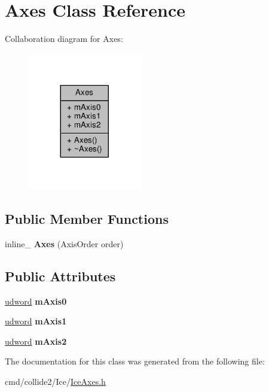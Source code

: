 \hypertarget{classAxes}{}\section{Axes Class Reference}
\label{classAxes}


Collaboration diagram for Axes\+:
\nopagebreak
\begin{figure}[H]
\begin{center}
\leavevmode
\includegraphics[width=140pt]{d1/d79/classAxes__coll__graph}
\end{center}
\end{figure}
\subsection*{Public Member Functions}
\begin{DoxyCompactItemize}
\item 
inline\+\_\+ {\bfseries Axes} (Axis\+Order order)\hypertarget{classAxes_afc6cb9cc184d368fc3396822721b7396}{}\label{classAxes_afc6cb9cc184d368fc3396822721b7396}

\end{DoxyCompactItemize}
\subsection*{Public Attributes}
\begin{DoxyCompactItemize}
\item 
\hyperlink{IceTypes_8h_a44c6f1920ba5551225fb534f9d1a1733}{udword} {\bfseries m\+Axis0}\hypertarget{classAxes_ac5bcbfce6741b8846eb8d21aef50081c}{}\label{classAxes_ac5bcbfce6741b8846eb8d21aef50081c}

\item 
\hyperlink{IceTypes_8h_a44c6f1920ba5551225fb534f9d1a1733}{udword} {\bfseries m\+Axis1}\hypertarget{classAxes_a7ca52fbdbdfeb2e2f0374ebe5e546444}{}\label{classAxes_a7ca52fbdbdfeb2e2f0374ebe5e546444}

\item 
\hyperlink{IceTypes_8h_a44c6f1920ba5551225fb534f9d1a1733}{udword} {\bfseries m\+Axis2}\hypertarget{classAxes_a5b43e8f1a068fdfcdfefe677b24ceff1}{}\label{classAxes_a5b43e8f1a068fdfcdfefe677b24ceff1}

\end{DoxyCompactItemize}


The documentation for this class was generated from the following file\+:\begin{DoxyCompactItemize}
\item 
cmd/collide2/\+Ice/\hyperlink{IceAxes_8h}{Ice\+Axes.\+h}\end{DoxyCompactItemize}
